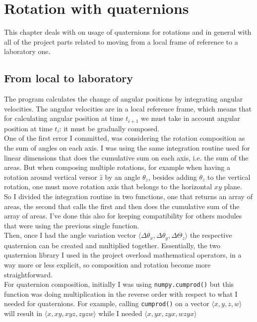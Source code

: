 \chapter{Rotation with quaternions}
\label{chap:rotation_with_quaternions}

This chapter deals with on usage of quaternions for rotations and in general with all of the project parts related to moving from a local frame of reference to a laboratory one.

\section{From local to laboratory}
The program calculates the change of angular positions by integrating angular velocities. The angular velocities are in a local reference frame, which means that for calculating angular position at time $t_{i+1}$ we must take in account angular position at time $t_i$: it must be gradually composed.\\
One of the first error I committed, was considering the rotation composition as the sum of angles on each axis. I was using the same integration routine used for linear dimensions that does the cumulative sum on each axis, i.e. the sum of the areas. But when composing multiple rotations, for example when having a rotation around vertical versor $\hat{z}$ by an angle $\theta_z$, besides adding $\theta_z$ to the vertical rotation, one must move rotation axis that belongs to the horizontal $xy$ plane. \\
So I divided the integration routine in two functions, one that returns an array of areas, the second that calls the first and then does the cumulative sum of the array of areas. I've done this also for keeping compatibility for others modules that were using the previous single function. \\
Then, once I had the angle variation vector $\langle\Delta\theta_x,\Delta\theta_y,\Delta\Theta_z\rangle$ the respective quaternion can be created and multiplied together. 
Essentially, the two quaternion library I used in the project overload mathematical operators, in a way more or less explicit, so composition and rotation become more straightforward. \\
For quaternion composition, initially I was using \texttt{numpy.cumprod()} \cite{numpy-cumprod} but this function was doing multiplication in the reverse order with respect to what I needed for quaternions. For example, calling \texttt{cumprod()} on a vector $\langle x,y,z,w \rangle$ will result in $\langle x,xy,xyz,zyzw \rangle$ while I needed $\langle x,yx,zyx,wzyx \rangle$  \\


